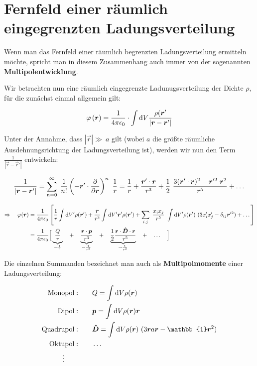 \section{Fernfeld einer räumlich eingegrenzten Ladungsverteilung}

Wenn man das Fernfeld einer räumlich begrenzten Ladungsverteilung ermitteln möchte, spricht man in diesem Zusammenhang auch immer von der sogenannten \textbf{Multipolentwicklung}.

Wir betrachten nun eine räumlich eingegrenzte Ladunugsverteilung der Dichte $\rho$, für die zunächst einmal allgemein gilt:

\begin{equation*}
\varphi\left(\bm{r}\right) = \frac{1}{4\pi\epsilon_0}\cdot\int\mathrm{d} V \frac{\rho(\bm{r}'}{|\bm{r}-\bm{r}'|}
\end{equation*}

Unter der Annahme, dass $|\vec{r}| \gg \ a$ gilt (wobei $a$ die größte räumliche Ausdehnungsrichtung der Ladungsverteilung ist), werden wir nun den Term $\frac{1}{|\vec{r}-\vec{r}'|}$ entwickeln:

\begin{equation*}
\frac{1}{|\bm{r}-\bm{r}'|} = \sum_{n=0}^{\infty} \; \frac{1}{n!}\left(-\bm{r}'\cdot\frac{\partial{}}{\partial{\bm{r}}}\right)^n \ \frac{1}{r} = \frac{1}{r} + \frac{\bm{r}'\cdot\bm{r}}{r^3} + \frac{1}{2} \ \frac{3 (\bm{r}'\cdot\bm{r})^2 - \bm{r}'^2 \ \bm{r}^2}{r^5} + \dotsc
\end{equation*}

\begin{align*}
\Rightarrow \quad \varphi(\bm{r}) &= \frac{1}{4\pi\epsilon_0} \left[ \frac{1}{r}\int\mathrm{d} V' \rho(\bm{r}') + \frac{\bm{r}}{r^3} \int\mathrm{d} V' \bm{r}' \rho(\bm{r}') + \sum_{i,j} \ \frac{x_i x_j}{r^5} \ \int\mathrm{d} V' \rho(\bm{r}') \ (3x_i'x_j' - \delta_{ij}\bm{r}'^2) + \dotsc\right] \\
&= \frac{1}{4\pi\epsilon_0} \Big[\underbrace{\frac{Q}{r}}_{\sim\frac{1}{r}} \quad + \quad \underbrace{\frac{\bm{r}\cdot\bm{p}}{r^3}}_{\sim\frac{1}{r^2}} \quad + \quad \underbrace{\frac{1}{2}\frac{\bm{r}\cdot \bm{\hat{D}} \cdot\bm{r}}{r^5}}_{\sim\frac{1}{r^3}} \quad + \quad \dotsc \quad \Big]
\end{align*}

Die einzelnen Summanden bezeichnet man auch als \textbf{Multipolmomente} einer Ladungsverteilung:

\begin{align*}
\mathrm{Monopol:}& \qquad Q = \int\d V \rho(\vec{r})\\
\mathrm{Dipol:}& \qquad \vec{p} = \int\d V \rho(\vec{r})\vec{r}\\
\mathrm{Quadrupol:}& \qquad \tens{D} = \int\d V \rho(\vec{r}) \ (3\vec{r}a\vec{r}-\mathbb{1}\vec{r}^2)\\
\mathrm{Oktupol:}& \qquad \dotsc\\
\vdots \qquad &
\end{align*}

